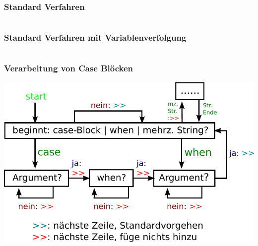 \begin{frame}
\frametitle{Standard Verfahren}
\inputminted[linenos, numbersep=3pt, tabsize=2, frame=lines]{ruby}{preprocessor/sampleStandard.rb}
\end{frame}

\begin{frame}
\frametitle{Standard Verfahren mit Variablenverfolgung}
  \inputminted[linenos, numbersep=5pt, tabsize=4, frame=lines]{ruby}{preprocessor/sampleDebug.rb}
\end{frame}

\begin{frame}
\frametitle{Verarbeitung von Case Blöcken}
\begin{center}
\includegraphics[scale=0.8]{preprocessor/pics/CaseBlockVerarbeitung}
\end{center}
\end{frame}

\begin{frame}
\end{frame}

